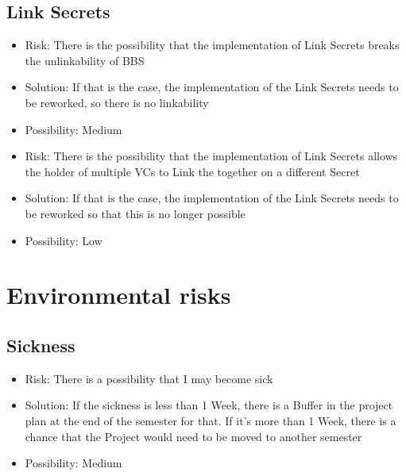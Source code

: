 \documentclass[
	a4paper               %
	,bibliography=totoc   %
	,listof=totoc         %
	,monolingual
	twoside=false,
]{bfhthesis}              %
\begin{document}
\subsection{Link Secrets}
\begin{itemize}
	\item Risk: There is the possibility that the implementation of Link Secrets breaks the unlinkability of BBS
	\item Solution: If that is the case, the implementation of the Link Secrets needs to be reworked, so there is no linkability
	\item Possibility: Medium
\end{itemize}
\begin{itemize}
	\item Risk: There is the possibility that the implementation of Link Secrets allows the holder of multiple VCs to Link the together on a different Secret
	\item Solution: If that is the case, the implementation of the Link Secrets needs to be reworked so that this is no longer possible
	\item Possibility: Low
\end{itemize}

\section{Environmental risks}

\subsection{Sickness}
\begin{itemize}
	\item Risk: There is a possibility that I may become sick
	\item Solution: If the sickness is less than 1 Week, there is a Buffer in the project plan at the end of the semester for that. If it's more than 1 Week, there is a chance that the Project would need to be moved to another semester
	\item Possibility: Medium
\end{itemize}
\end{document}
